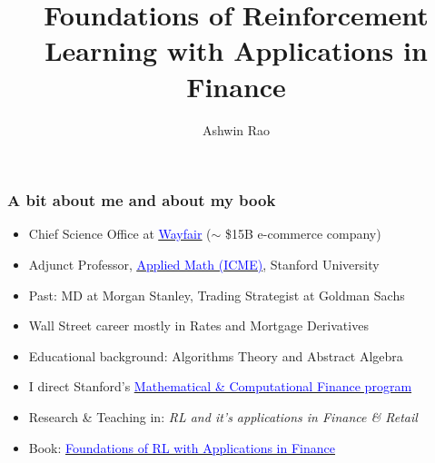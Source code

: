 \documentclass[handout]{beamer}
\title[RL for Finance]{Foundations of Reinforcement Learning with Applications in Finance} %
\author{Ashwin Rao} %
\institute[Stanford] %
{Stanford University
}
\date{} %
\begin{document}
\begin{frame}
\titlepage %
\end{frame}



\begin{frame}
\frametitle{A bit about me and about my book}
\pause
\begin{itemize}[<+->]
\item Chief Science Office at  \href{https://wayfair.com/}{\underline{\textcolor{blue}{Wayfair}}} ($\sim$ \$15B e-commerce company)
\item Adjunct Professor, \href{https://icme.stanford.edu/}{\underline{\textcolor{blue}{Applied Math (ICME)}}}, Stanford University
\item Past: MD at Morgan Stanley, Trading Strategist at Goldman Sachs
\item Wall Street career mostly in Rates and Mortgage Derivatives
\item Educational background: Algorithms Theory and Abstract Algebra
\item I direct Stanford's \href{https://mcf.stanford.edu/}{\underline{\textcolor{blue}{Mathematical \& Computational Finance program}}}
\item Research \& Teaching in: {\em RL and it's applications in Finance \& Retail}
\item Book:  \href{http://stanford.edu/~ashlearn/RLForFinanceBook/book.pdf}{\underline{\textcolor{blue}{Foundations of RL with Applications in Finance}}}

\end{itemize}
\end{frame}
\end{document}
